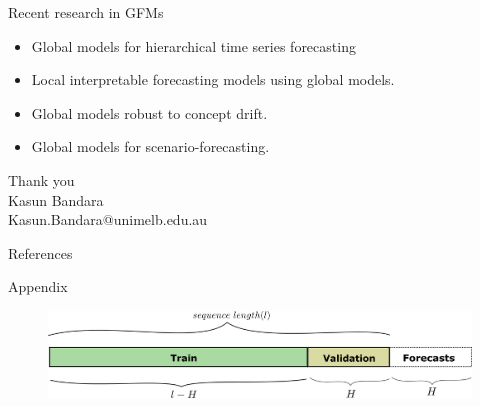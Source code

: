 \documentclass{beamer}
\begin{document}
  
 \begin{frame}{Recent research in GFMs}
  \begin{itemize}
  		\item Global models for hierarchical time series forecasting 
  		\vspace{2mm}
  		\item Local interpretable forecasting models using global models.
  		\vspace{2mm}
  		\item Global models robust to concept drift.
  		\vspace{2mm}
  		\item Global models for scenario-forecasting.
		\end{itemize}
  \end{frame}  


  \begin{frame}
  \begin{center}
  {\Huge Thank you}\vspace{1cm}\\
  Kasun Bandara\vspace{0.2cm}\\
  \textcolor{DiCITSBlue}{Kasun.Bandara@unimelb.edu.au}\\
  \end{center}
\end{frame}

\begin{frame}[allowframebreaks]{References} 
  \scriptsize


\end{frame}

\begin{frame}{Appendix}
  	\begin{figure}
   \includegraphics[scale=0.40]{images/trainvalidation}
   \caption{}
  \end{figure} 
\end{frame}


%
\end{document}
